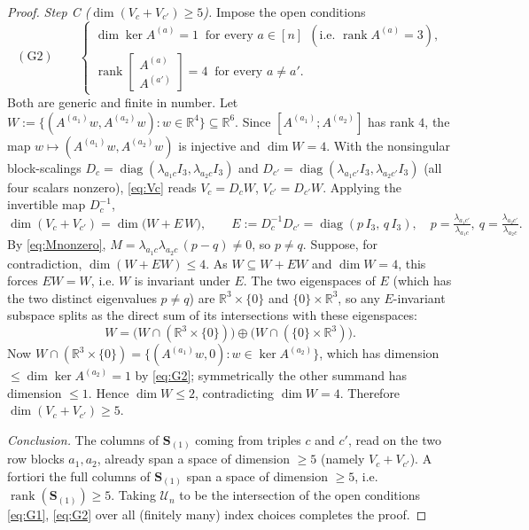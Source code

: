 \begin{proof}
\medskip\noindent\emph{Step C ($\dim(V_c+V_{c'})\ge5$).}
Impose the open conditions
\begin{equation}\label{eq:G2}
\operatorname{(G2)}\qquad
\begin{cases}
\dim\ker A^{(a)}=1\ \text{ for every }a\in[n]\ \ (\text{i.e. }\operatorname{rank}A^{(a)}=3),\\[2pt]
\operatorname{rank}\!\begin{bmatrix}A^{(a)}\\ A^{(a')}\end{bmatrix}=4\ \text{ for every }a\ne a' .
\end{cases}
\end{equation}
Both are generic and finite in number. Let
$W:=\{(A^{(a_1)}w,A^{(a_2)}w):w\in\mathbb R^4\}\subseteq\mathbb R^6$. Since
$[A^{(a_1)};A^{(a_2)}]$ has rank $4$, the map $w\mapsto(A^{(a_1)}w,A^{(a_2)}w)$ is injective
and $\dim W=4$. With the nonsingular block-scalings $D_c=\operatorname{diag}(\lambda_{a_1c}I_3,
\lambda_{a_2c}I_3)$ and $D_{c'}=\operatorname{diag}(\lambda_{a_1c'}I_3,\lambda_{a_2c'}I_3)$
(all four scalars nonzero), \eqref{eq:Vc} reads $V_c=D_cW$, $V_{c'}=D_{c'}W$. Applying the
invertible map $D_c^{-1}$,
\[
\dim(V_c+V_{c'})=\dim\big(W+E\,W\big),\qquad
E:=D_c^{-1}D_{c'}=\operatorname{diag}(p\,I_3,\,q\,I_3),\quad
p=\tfrac{\lambda_{a_1c'}}{\lambda_{a_1c}},\ q=\tfrac{\lambda_{a_2c'}}{\lambda_{a_2c}} .
\]
By \eqref{eq:Mnonzero}, $M=\lambda_{a_1c}\lambda_{a_2c}\,(p-q)\ne0$, so $p\ne q$. Suppose, for
contradiction, $\dim(W+EW)\le4$. As $W\subseteq W+EW$ and $\dim W=4$, this forces $EW=W$, i.e.
$W$ is invariant under $E$. The two eigenspaces of $E$ (which has the two distinct eigenvalues
$p\ne q$) are $\mathbb R^3\times\{0\}$ and $\{0\}\times\mathbb R^3$, so any $E$-invariant
subspace splits as the direct sum of its intersections with these eigenspaces:
\[
W=\big(W\cap(\mathbb R^3\times\{0\})\big)\oplus\big(W\cap(\{0\}\times\mathbb R^3)\big).
\]
Now $W\cap(\mathbb R^3\times\{0\})=\{(A^{(a_1)}w,0):w\in\ker A^{(a_2)}\}$, which has dimension
$\le\dim\ker A^{(a_2)}=1$ by \eqref{eq:G2}; symmetrically the other summand has dimension
$\le1$. Hence $\dim W\le2$, contradicting $\dim W=4$. Therefore $\dim(V_c+V_{c'})\ge5$.

\medskip\noindent\emph{Conclusion.}
The columns of $\mathbf S_{(1)}$ coming from triples $c$ and $c'$, read on the two row blocks
$a_1,a_2$, already span a space of dimension $\ge5$ (namely $V_c+V_{c'}$). A fortiori the full
columns of $\mathbf S_{(1)}$ span a space of dimension $\ge5$, i.e.\
$\operatorname{rank}(\mathbf S_{(1)})\ge5$. Taking $\mathcal U_n$ to be the intersection of the
open conditions \eqref{eq:G1}, \eqref{eq:G2} over all (finitely many) index choices completes
the proof.
\end{proof}

